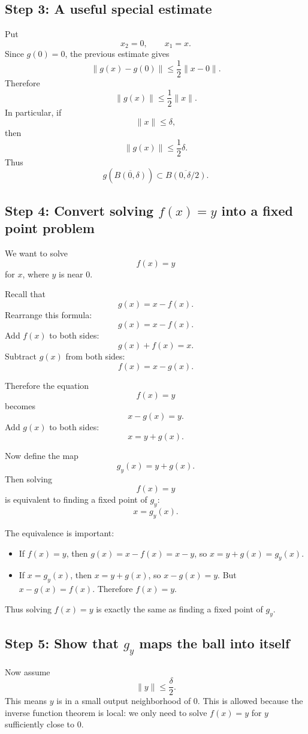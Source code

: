 \documentclass[11pt]{article}
\begin{document}
\subsection*{Step 3: A useful special estimate}

Put
\[
x_2=0,
\qquad x_1=x.
\]
Since $g(0)=0$, the previous estimate gives
\[
\|g(x)-g(0)\|\le \frac12\|x-0\|.
\]
Therefore
\[
\|g(x)\|\le \frac12\|x\|.
\]
In particular, if
\[
\|x\|\le \delta,
\]
then
\[
\|g(x)\|\le \frac12\delta.
\]
Thus
\[
g(\overline{B(0,\delta)})\subset \overline{B(0,\delta/2)}.
\]

\subsection*{Step 4: Convert solving $f(x)=y$ into a fixed point problem}

We want to solve
\[
f(x)=y
\]
for $x$, where $y$ is near $0$.

Recall that
\[
g(x)=x-f(x).
\]
Rearrange this formula:
\[
g(x)=x-f(x).
\]
Add $f(x)$ to both sides:
\[
g(x)+f(x)=x.
\]
Subtract $g(x)$ from both sides:
\[
f(x)=x-g(x).
\]

Therefore the equation
\[
f(x)=y
\]
becomes
\[
x-g(x)=y.
\]
Add $g(x)$ to both sides:
\[
x=y+g(x).
\]

Now define the map
\[
g_y(x)=y+g(x).
\]
Then solving
\[
f(x)=y
\]
is equivalent to finding a fixed point of $g_y$:
\[
x=g_y(x).
\]

The equivalence is important:

\begin{itemize}[leftmargin=2em]
\item If $f(x)=y$, then $g(x)=x-f(x)=x-y$, so $x=y+g(x)=g_y(x)$.
\item If $x=g_y(x)$, then $x=y+g(x)$, so $x-g(x)=y$. But $x-g(x)=f(x)$. Therefore $f(x)=y$.
\end{itemize}

Thus solving $f(x)=y$ is exactly the same as finding a fixed point of $g_y$.

\subsection*{Step 5: Show that $g_y$ maps the ball into itself}

Now assume
\[
\|y\|\le \frac{\delta}{2}.
\]
This means $y$ is in a small output neighborhood of $0$. This is allowed because the inverse function theorem is local: we only need to solve $f(x)=y$ for $y$ sufficiently close to $0$.
\end{document}
